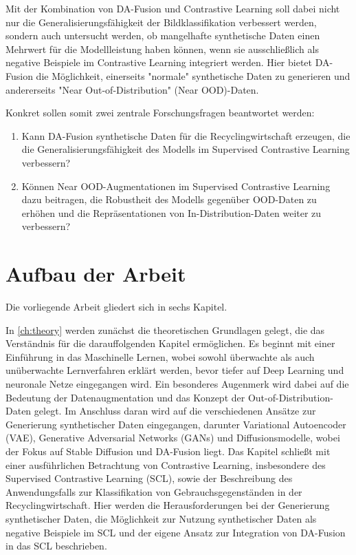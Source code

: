 Mit der Kombination von DA-Fusion und Contrastive Learning soll dabei nicht nur die Generalisierungsfähigkeit der Bildklassifikation verbessert werden, sondern auch untersucht werden, ob mangelhafte synthetische Daten einen Mehrwert für die Modellleistung haben können, wenn sie ausschließlich als negative Beispiele im Contrastive Learning integriert werden. Hier bietet DA-Fusion die Möglichkeit, einerseits "normale" synthetische Daten zu generieren und andererseits "Near Out-of-Distribution" (Near OOD)-Daten.

\newpage

Konkret sollen somit zwei zentrale Forschungsfragen beantwortet werden:

\begin{enumerate}
    \item Kann DA-Fusion synthetische Daten für die Recyclingwirtschaft erzeugen, die die Generalisierungsfähigkeit des Modells im Supervised Contrastive Learning verbessern?
    \item Können Near OOD-Augmentationen im Supervised Contrastive Learning dazu beitragen, die Robustheit des Modells gegenüber OOD-Daten zu erhöhen und die Repräsentationen von In-Distribution-Daten weiter zu verbessern?
\end{enumerate}

\section{Aufbau der Arbeit} \label{sec:structure}

Die vorliegende Arbeit gliedert sich in sechs Kapitel. 

In \autoref{ch:theory} werden zunächst die theoretischen Grundlagen gelegt, die das Verständnis für die darauffolgenden Kapitel ermöglichen. Es beginnt mit einer Einführung in das Maschinelle Lernen, wobei sowohl überwachte als auch unüberwachte Lernverfahren erklärt werden, bevor tiefer auf Deep Learning und neuronale Netze eingegangen wird. Ein besonderes Augenmerk wird dabei auf die Bedeutung der Datenaugmentation und das Konzept der Out-of-Distribution-Daten gelegt. Im Anschluss daran wird auf die verschiedenen Ansätze zur Generierung synthetischer Daten eingegangen, darunter Variational Autoencoder (VAE), Generative Adversarial Networks (GANs) und Diffusionsmodelle, wobei der Fokus auf Stable Diffusion und DA-Fusion liegt. Das Kapitel schließt mit einer ausführlichen Betrachtung von Contrastive Learning, insbesondere des Supervised Contrastive Learning (SCL), sowie der Beschreibung des Anwendungsfalls zur Klassifikation von Gebrauchsgegenständen in der Recyclingwirtschaft. Hier werden die Herausforderungen bei der Generierung synthetischer Daten, die Möglichkeit zur Nutzung synthetischer Daten als negative Beispiele im SCL und der eigene Ansatz zur Integration von DA-Fusion in das SCL beschrieben.

